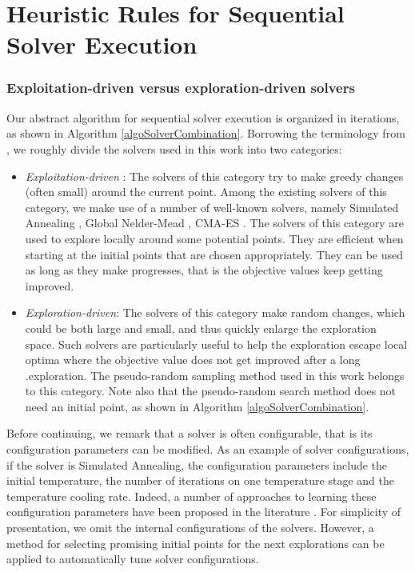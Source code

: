 \section{Heuristic Rules for Sequential Solver Execution}\label{Solvers}

\subsubsection*{Exploitation-driven versus exploration-driven solvers}
Our abstract algorithm for sequential solver execution is organized in iterations, as shown in Algorithm \ref{algoSolverCombination}. Borrowing the terminology from \cite{}, we roughly divide the solvers used in this work into two categories: 
\begin{itemize}
\item {\em Exploitation-driven} : The solvers of this category try to make greedy changes (often small) around the current point. Among the existing solvers of this category, we make use of a number of well-known solvers, namely Simulated Annealing \cite{}, Global Nelder-Mead \cite{}, CMA-ES \cite{}. The solvers of this category are used to explore locally around some potential points. They are efficient when starting at the initial points that are chosen appropriately. They can be used as long as they make progresses, that is the objective values keep getting improved.
\item {\em Exploration-driven}: The solvers of this category make random changes, which could be both large and small, and thus quickly enlarge the exploration space. Such solvers are particularly useful to help the exploration escape local optima where the objective value does not get improved after a long .exploration. The pseudo-random sampling method used in this work belongs to this category. Note also that the pseudo-random search method does not need an initial point, as shown in Algorithm \ref{algoSolverCombination}. 
\end{itemize}
Before continuing, we remark that a solver is often configurable, that is its configuration parameters can be modified. As an example of solver configurations, if the solver is Simulated Annealing, the configuration parameters include the initial temperature, the number of iterations on one temperature stage and the temperature cooling rate. Indeed, a number of approaches to learning these configuration parameters have been proposed in the literature \cite{}. For simplicity of presentation, we omit the internal configurations of the solvers. However, a method for selecting promising initial points for the next explorations can be applied to automatically tune solver configurations. 

